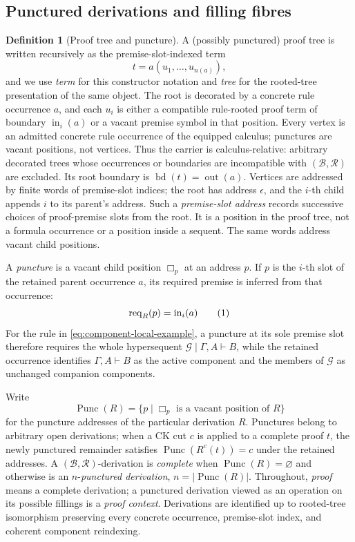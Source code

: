 \documentclass[10pt,a4paper]{article}
\theoremstyle{plain}
\theoremstyle{definition}
\newtheorem{definition}[theorem]{Definition}
\theoremstyle{remark}
\newcommand{\Base}{\mathcal B}
\newcommand{\Rules}{\mathcal R}
\newcommand{\ms}{\mathrel{\vdash}}
\newcommand{\rootseq}{\operatorname{bd}}
\newcommand{\Req}{\operatorname{req}}
\newcommand{\Punc}{\operatorname{Punc}}
\newcommand{\eqtag}{\refstepcounter{equation}\tag{\theequation}}
\begin{document}
\subsection{Punctured derivations and filling fibres}

\begin{definition}[Proof tree and puncture]
\label{def:proof-tree}
A (possibly punctured) proof tree is written recursively as the
premise-slot-indexed term
\[
                    t=a(u_1,\ldots,u_{n(a)}),
\]
and we use \emph{term} for this constructor notation and \emph{tree} for
the rooted-tree presentation of the same object.  The root is decorated by
a concrete rule occurrence \(a\), and each
\(u_i\) is either a compatible rule-rooted proof term of boundary
\(\operatorname{in}_i(a)\) or a vacant premise symbol in that position.
Every vertex is an admitted concrete rule occurrence of the equipped
calculus; punctures are vacant positions, not vertices.  Thus the carrier
is calculus-relative: arbitrary decorated trees whose occurrences or
boundaries are incompatible with \((\Base,\Rules)\) are excluded.  Its root boundary is
\(\rootseq(t)=\operatorname{out}(a)\).  Vertices are addressed by finite
words of premise-slot indices; the root has address \(\epsilon\), and the
\(i\)-th child appends \(i\) to its parent's address.  Such a
\emph{premise-slot address} records successive choices of proof-premise
slots from the root.  It is a position in the proof tree, not a formula
occurrence or a position inside a sequent.  The same words address vacant
child positions.

A \emph{puncture} is a vacant child position \(\Box_p\) at an address
\(p\).  If \(p\) is the \(i\)-th slot of the retained parent occurrence
\(a\), its required premise is inferred from that occurrence:
\[
 \Req_R(p)=\operatorname{in}_i(a)
\eqtag\label{eq:puncture-requirement}
\]
For the rule in \eqref{eq:component-local-example}, a puncture at its sole
premise slot therefore requires the whole hypersequent
\(\mathcal G\mid\Gamma,A\ms B\), while the retained occurrence identifies
\(\Gamma,A\ms B\) as the active component and the members of
\(\mathcal G\) as unchanged companion components.

Write
\[
       \Punc(R)=\{p\mid \Box_p\text{ is a vacant position of }R\}
\]
for the puncture addresses of the particular derivation \(R\).  Punctures
belong to arbitrary open derivations; when a CK cut \(c\) is applied to a
complete proof \(t\), the newly punctured remainder satisfies
\(\Punc(R^c(t))=c\) under the retained addresses.  A
\((\Base,\Rules)\)-derivation is \emph{complete} when
\(\Punc(R)=\varnothing\) and otherwise is an
\(n\)-\emph{punctured derivation}, \(n=|\Punc(R)|\).
Throughout, \emph{proof} means a complete derivation; a punctured
derivation viewed as an operation on its possible fillings is a
\emph{proof context}.  Derivations are identified up to rooted-tree
isomorphism preserving every concrete occurrence, premise-slot index, and
coherent component reindexing.
\end{definition}
\end{document}
